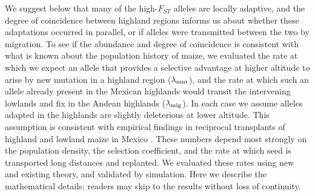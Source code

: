 We suggest below that many of the high-$F_{ST}$ alleles are locally adaptive,
and the degree of coincidence between highland regions informs us about 
whether these adaptations occurred in parallel, 
or if alleles were transmitted between the two by migration.
To see if the abundance and degree of coincidence is consistent with what is known about the population history of maize,
we evaluated the rate at which we expect an allele that provides a selective advantage at higher altitude
to arise by new mutation in a highland region ($\lambda_{\text{mut}}$),
and the rate at which such an allele already present in the Mexican highlands
would transit the intervening lowlands and fix in the Andean highlands ($\lambda_{\text{mig}}$).
In each case we assume alleles adapted in the highlands are slightly deleterious at lower altitude.  This assumption is consistent with empirical findings in reciprocal transplants of highland and lowland maize in Mexico \cite[]{Mercer2008}.
These numbers depend most strongly on the population density, 
the selection coefficient,
and the rate at which seed is transported long distances and replanted.
We evaluated these rates using new and existing theory, and validated by simulation. Here we describe the mathematical details; readers may skip to the results without loss of continuity.



